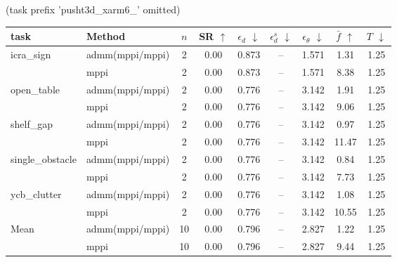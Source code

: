 (task prefix 'pusht3d_xarm6_' omitted)

\begin{tabular}{@{}llccccccc@{}}
    \toprule
    task & Method & $n$ & SR $\uparrow$ & $\epsilon_d$ $\downarrow$ & $\epsilon_d^s$ $\downarrow$ & $\epsilon_\theta$ $\downarrow$ & $\bar{f}$ $\uparrow$ & $T$ $\downarrow$ \\
    \midrule
    \multirow{2}{*}{icra\_sign} & admm(mppi/mppi) & 2 & 0.00 & 0.873 & -- & 1.571 & 1.31 & 1.25 \\
     & mppi & 2 & 0.00 & 0.873 & -- & 1.571 & 8.38 & 1.25 \\
    \midrule
    \multirow{2}{*}{open\_table} & admm(mppi/mppi) & 2 & 0.00 & 0.776 & -- & 3.142 & 1.91 & 1.25 \\
     & mppi & 2 & 0.00 & 0.776 & -- & 3.142 & 9.06 & 1.25 \\
    \midrule
    \multirow{2}{*}{shelf\_gap} & admm(mppi/mppi) & 2 & 0.00 & 0.776 & -- & 3.142 & 0.97 & 1.25 \\
     & mppi & 2 & 0.00 & 0.776 & -- & 3.142 & 11.47 & 1.25 \\
    \midrule
    \multirow{2}{*}{single\_obstacle} & admm(mppi/mppi) & 2 & 0.00 & 0.776 & -- & 3.142 & 0.84 & 1.25 \\
     & mppi & 2 & 0.00 & 0.776 & -- & 3.142 & 7.73 & 1.25 \\
    \midrule
    \multirow{2}{*}{ycb\_clutter} & admm(mppi/mppi) & 2 & 0.00 & 0.776 & -- & 3.142 & 1.08 & 1.25 \\
     & mppi & 2 & 0.00 & 0.776 & -- & 3.142 & 10.55 & 1.25 \\
    \midrule\midrule
    \multirow{2}{*}{Mean} & admm(mppi/mppi) & 10 & 0.00 & 0.796 & -- & 2.827 & 1.22 & 1.25 \\
     & mppi & 10 & 0.00 & 0.796 & -- & 2.827 & 9.44 & 1.25 \\
    \bottomrule
\end{tabular}
